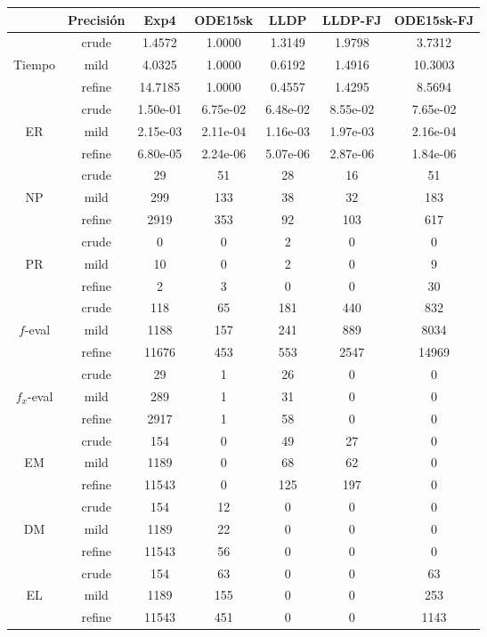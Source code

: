 \begin{table}[htb]
	\centering
\begin{tabular}{ |c|c|c|c|c|c|c| }
\hline
 & Precisi\'on & Exp4 & ODE15sk & LLDP & LLDP-FJ & ODE15sk-FJ \\
\hline
  & crude & 1.4572 & 1.0000 & 1.3149 & 1.9798 & 3.7312 \\
 Tiempo  & mild & 4.0325 & 1.0000 & 0.6192 & 1.4916 & 10.3003 \\
  & refine & 14.7185 & 1.0000 & 0.4557 & 1.4295 & 8.5694 \\
\hline
  & crude & 1.50e-01 & 6.75e-02 & 6.48e-02 & 8.55e-02 & 7.65e-02 \\
 ER  & mild & 2.15e-03 & 2.11e-04 & 1.16e-03 & 1.97e-03 & 2.16e-04 \\
  & refine & 6.80e-05 & 2.24e-06 & 5.07e-06 & 2.87e-06 & 1.84e-06 \\
\hline
  & crude & 29 & 51 & 28 & 16 & 51 \\
 NP  & mild & 299 & 133 & 38 & 32 & 183 \\
  & refine & 2919 & 353 & 92 & 103 & 617 \\
\hline
  & crude & 0 & 0 & 2 & 0 & 0 \\
 PR  & mild & 10 & 0 & 2 & 0 & 9 \\
  & refine & 2 & 3 & 0 & 0 & 30 \\
\hline
  & crude & 118 & 65 & 181 & 440 & 832 \\
 $f$-eval  & mild & 1188 & 157 & 241 & 889 & 8034 \\
  & refine & 11676 & 453 & 553 & 2547 & 14969 \\
\hline
  & crude & 29 & 1 & 26 & 0 & 0 \\
 $f_x$-eval  & mild & 289 & 1 & 31 & 0 & 0 \\
  & refine & 2917 & 1 & 58 & 0 & 0 \\
\hline
  & crude & 154 & 0 & 49 & 27 & 0 \\
 EM  & mild & 1189 & 0 & 68 & 62 & 0 \\
  & refine & 11543 & 0 & 125 & 197 & 0 \\
\hline
  & crude & 154 & 12 & 0 & 0 & 0 \\
 DM  & mild & 1189 & 22 & 0 & 0 & 0 \\
  & refine & 11543 & 56 & 0 & 0 & 0 \\
\hline
  & crude & 154 & 63 & 0 & 0 & 63 \\
 EL  & mild & 1189 & 155 & 0 & 0 & 253 \\
  & refine & 11543 & 451 & 0 & 0 & 1143 \\

\end{tabular}
\end{table}
